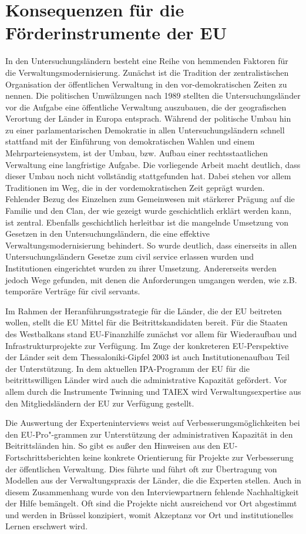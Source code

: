 \section{Konsequenzen für die Förderinstrumente der EU}
In den Untersuchungsländern besteht eine Reihe von hemmenden Faktoren für die Verwaltungsmodernisierung. Zunächst ist die Tradition der zentralistischen Organisation der öffentlichen Verwaltung in den vor-demokratischen Zeiten zu nennen. Die politischen Umwälzungen nach 1989 stellten die Untersuchungsländer vor die Aufgabe eine öffentliche Verwaltung auszubauen, die der geografischen Verortung der Länder in Europa entsprach. Während der politische Umbau hin zu einer parlamentarischen Demokratie in allen Untersuchungsländern schnell stattfand mit der Einführung von demokratischen Wahlen und einem Mehrparteiensystem, ist der Umbau, bzw. Aufbau einer rechtsstaatlichen Verwaltung eine langfristige Aufgabe. Die vorliegende Arbeit macht deutlich, dass dieser Umbau noch nicht vollständig stattgefunden hat. Dabei stehen vor allem Traditionen im Weg, die in der vordemokratischen Zeit geprägt wurden. Fehlender Bezug des Einzelnen zum Gemeinwesen mit stärkerer Prägung auf die Familie und den Clan, der wie gezeigt wurde geschichtlich erklärt werden kann, ist zentral. Ebenfalls geschichtlich herleitbar ist die mangelnde Umsetzung von Gesetzen in den Untersuchungsländern, die eine effektive Verwaltungsmodernisierung behindert. So wurde deutlich, dass einerseits in allen Untersuchungsländern Gesetze zum civil service erlassen wurden und Institutionen eingerichtet wurden zu ihrer Umsetzung. Andererseits werden jedoch Wege gefunden, mit denen die Anforderungen umgangen werden, wie z.B. temporäre Verträge für civil servants.\par
Im Rahmen der Heranführungsstrategie für die Länder, die der EU beitreten wollen, stellt die EU Mittel für die Beitrittskandidaten bereit. Für die Staaten des Westbalkans stand EU-Finanzhilfe zunächst vor allem für Wiederaufbau und Infrastrukturprojekte zur Verfügung. Im Zuge der konkreteren EU-Perspektive der Länder seit dem Thessaloniki-Gipfel 2003 ist auch Institutionenaufbau Teil der Unterstützung. In dem aktuellen IPA-Programm der EU für die beitrittswilligen Länder wird auch die administrative Kapazität gefördert. Vor allem durch die Instrumente Twinning und TAIEX wird Verwaltungsexpertise aus den Mitgliedsländern der EU zur Verfügung gestellt.\par
Die Auswertung der Experteninterviews weist auf Verbesserungsmöglichkeiten bei den EU-Pro"-grammen zur Unterstützung der administrativen Kapazität in den Beitrittsländen hin. So gibt es außer den Hinweisen aus den EU-Fortschrittsberichten keine konkrete Orientierung für Projekte zur Verbesserung der öffentlichen Verwaltung. Dies führte und führt oft zur Übertragung von Modellen aus der Verwaltungspraxis der Länder, die die Experten stellen. Auch in diesem Zusammenhang wurde von den Interviewpartnern fehlende Nachhaltigkeit der Hilfe bemängelt. Oft sind die Projekte nicht ausreichend vor Ort abgestimmt und werden in Brüssel konzipiert, womit Akzeptanz vor Ort und institutionelles Lernen erschwert wird.\par
